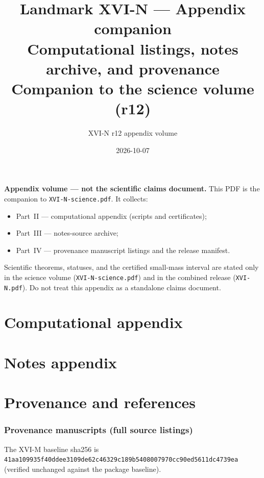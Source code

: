 \documentclass{article}
\title{Landmark XVI-N --- Appendix companion\\
\large Computational listings, notes archive, and provenance\\
\large Companion to the science volume (r12)}
\author{XVI-N r12 appendix volume}
\date{2026-10-07}
\begin{document}
\maketitle
\noindent\textbf{Appendix volume --- not the scientific claims document.}
This PDF is the companion to \texttt{XVI-N-science.pdf}. It collects:
\begin{itemize}
\item Part~II --- computational appendix (scripts and certificates);
\item Part~III --- notes-source archive;
\item Part~IV --- provenance manuscript listings and the release manifest.
\end{itemize}
Scientific theorems, statuses, and the certified small-mass interval are stated only in
the science volume (\texttt{XVI-N-science.pdf}) and in the combined release
(\texttt{XVI-N.pdf}). Do not treat this appendix as a standalone claims document.

\tableofcontents
\newpage

\part{Computational appendix}


\part{Notes appendix}


\part{Provenance and references}
\section{Provenance manuscripts (full source listings)}
\label{app:prov}
The XVI-M baseline sha256 is
\texttt{41aa109935f40ddee3109de62c46329c189b5408007970cc90ed5611dc4739ea}
(verified unchanged against the package baseline).
\end{document}
